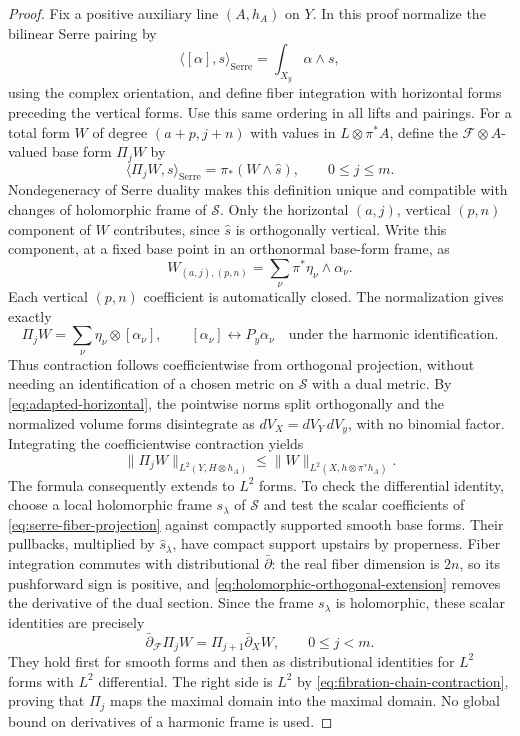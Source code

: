 \documentclass[11pt,reqno]{amsart}
\numberwithin{equation}{section}
\theoremstyle{definition}
\theoremstyle{remark}
\newcommand{\db}{\bar\partial}
\newcommand{\cF}{\mathcal F}
\newcommand{\ip}[2]{\langle #1,#2\rangle}
\begin{document}
\begin{proof}
Fix a positive auxiliary line $(A,h_A)$ on $Y$. In this proof normalize the bilinear Serre pairing by
\[
 \ip{[\alpha]}{s}_{\mathrm{Serre}}
                   =\int_{X_y}\alpha\wedge s,
\]
using the complex orientation, and define fiber integration with horizontal forms preceding the vertical forms. Use this same ordering in all lifts and pairings. For a total form $W$ of degree $(a+p,j+n)$ with values in $L\otimes\pi^*A$, define the $\cF\otimes A$-valued base form $\Pi_jW$ by
\begin{equation}\label{eq:serre-fiber-projection}
       \ip{\Pi_jW}{s}_{\mathrm{Serre}}
             =\pi_*(W\wedge\widehat s),\qquad 0\leq j\leq m.
\end{equation}
Nondegeneracy of Serre duality makes this definition unique and compatible with changes of holomorphic frame of $\mathcal S$. Only the horizontal $(a,j)$, vertical $(p,n)$ component of $W$ contributes, since $\widehat s$ is orthogonally vertical. Write this component, at a fixed base point in an orthonormal base-form frame, as
\[
 W_{(a,j),(p,n)}=\sum_\nu\pi^*\eta_\nu\wedge\alpha_\nu.
\]
Each vertical $(p,n)$ coefficient is automatically closed. The normalization gives exactly
\[
 \Pi_jW=\sum_\nu\eta_\nu\otimes[\alpha_\nu],
 \qquad [\alpha_\nu]\longleftrightarrow P_y\alpha_\nu
       \quad\text{under the harmonic identification}.
\]
Thus contraction follows coefficientwise from orthogonal projection, without needing an identification of a chosen metric on $\mathcal S$ with a dual metric. By \eqref{eq:adapted-horizontal}, the pointwise norms split orthogonally and the normalized volume forms disintegrate as $dV_X=dV_Y\,dV_y$, with no binomial factor. Integrating the coefficientwise contraction yields
\begin{equation}\label{eq:fibration-chain-contraction}
 \|\Pi_jW\|_{L^2(Y,H\otimes h_A)}
             \leq\|W\|_{L^2(X,h\otimes\pi^*h_A)}.
\end{equation}
The formula consequently extends to $L^2$ forms. To check the differential identity, choose a local holomorphic frame $s_\lambda$ of $\mathcal S$ and test the scalar coefficients of \eqref{eq:serre-fiber-projection} against compactly supported smooth base forms. Their pullbacks, multiplied by $\widehat s_\lambda$, have compact support upstairs by properness. Fiber integration commutes with distributional $\db$: the real fiber dimension is $2n$, so its pushforward sign is positive, and \eqref{eq:holomorphic-orthogonal-extension} removes the derivative of the dual section. Since the frame $s_\lambda$ is holomorphic, these scalar identities are precisely
\begin{equation}\label{eq:fibration-chain-identity}
       \db_{\cF}\Pi_jW=\Pi_{j+1}\db_XW,
                         \qquad 0\leq j<m.
\end{equation}
They hold first for smooth forms and then as distributional identities for $L^2$ forms with $L^2$ differential. The right side is $L^2$ by \eqref{eq:fibration-chain-contraction}, proving that $\Pi_j$ maps the maximal domain into the maximal domain. No global bound on derivatives of a harmonic frame is used.


\end{proof}
\end{document}
